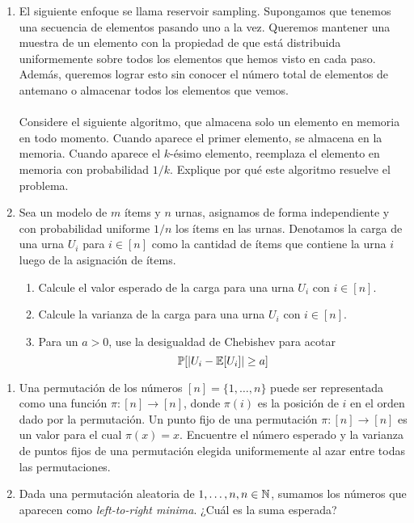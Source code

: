 \begin{problema}{1}
	\begin{enumerate}[label=\arabic*.]
		\item El siguiente enfoque se llama reservoir sampling. Supongamos que tenemos una secuencia
de elementos pasando uno a la vez. Queremos mantener una muestra de un elemento con
la propiedad de que está distribuida uniformemente sobre todos los elementos que hemos
visto en cada paso. Además, queremos lograr esto sin conocer el número total de elementos
de antemano o almacenar todos los elementos que vemos. \\
\\
Considere el siguiente algoritmo, que almacena solo un elemento en memoria en todo
momento. Cuando aparece el primer elemento, se almacena en la memoria. Cuando aparece
el $k$-ésimo elemento, reemplaza el elemento en memoria con probabilidad $1/k$. Explique
por qué este algoritmo resuelve el problema.
\item Sea un modelo de $m$ ítems y $n$ urnas, asignamos de forma independiente y con probabilidad uniforme $1/n$ los ítems en las urnas. Denotamos la carga de una urna $U_i$ para $i \in [n]$ como la cantidad de ítems que contiene la urna $i$ luego de la asignación de ítems.
	\begin{enumerate}[label=\alph*)]
		\item Calcule el valor esperado de la carga para una urna $U_i$ con $i \in [n]$.
		\item Calcule la varianza de la carga para una urna $U_i$ con $i \in [n]$.
		\item Para un $a > 0$, use la desigualdad de Chebishev para acotar
			\[
				\mathbb{P}[|U_i - \mathbb{E}[U_i]| \geq a]
			\]
		
	\end{enumerate}
	\end{enumerate}
\end{problema}
\begin{solucion}

\end{solucion}

\newpage
\begin{problema}{2}
	\begin{enumerate}[label=\arabic*.]
		\item Una permutación de los números $[n] = \{1,\dots, n\}$ puede ser representada como una función $\pi : [n] \to [n]$, donde $π(i)$ es la posición de $i$ en el orden dado por la permutación. Un punto fijo de una permutación $\pi : [n] \to [n]$ es un valor para el cual $\pi(x) = x$. Encuentre el número esperado y la varianza de puntos fijos de una permutación elegida uniformemente al azar entre todas las permutaciones.
		\item Dada una permutación aleatoria de ${1, \dots , n}, n \in \mathbb{N}$, sumamos los números que aparecen como \emph{left-to-right minima}. ¿Cuál es la suma esperada?
	\end{enumerate}
\end{problema}
\begin{solucion}
	
\end{solucion}

